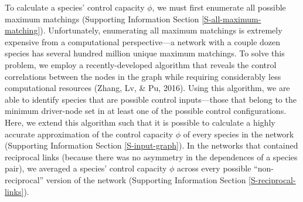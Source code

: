 \documentclass[a4paper]{artikel1}
\theoremstyle{definition}
\theoremstyle{definition}
\theoremstyle{definition}
\theoremstyle{remark}
\begin{document}
To calculate a species' control capacity \(\phi\), we must first
enumerate all possible maximum matchings (Supporting Information Section
\ref{S-all-maximum-matching}). Unfortunately, enumerating all maximum
matchings is extremely expensive from a computational perspective---a
network with a couple dozen species has several hundred million unique
maximum matchings. To solve this problem, we employ a recently-developed
algorithm that reveals the control correlations between the nodes in the
graph while requiring considerably less computational resources (Zhang,
Lv, \& Pu, 2016). Using this algorithm, we are able to identify species
that are possible control inputs---those that belong to the minimum
driver-node set in at least one of the possible control configurations.
Here, we extend this algorithm such that it is possible to calculate a
highly accurate approximation of the control capacity \(\phi\) of every
species in the network (Supporting Information Section
\ref{S-input-graph}). In the networks that contained reciprocal links
(because there was no asymmetry in the dependences of a species pair),
we averaged a species' control capacity \(\phi\) across every possible
``non-reciprocal'' version of the network (Supporting Information
Section \ref{S-reciprocal-links}).
\end{document}
